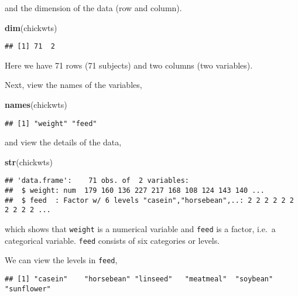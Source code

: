 \documentclass[]{book}
\newenvironment{Shaded}{\begin{snugshade}}{\end{snugshade}}
\newcommand{\KeywordTok}[1]{\textcolor[rgb]{0.13,0.29,0.53}{\textbf{{#1}}}}
\newcommand{\NormalTok}[1]{{#1}}
\theoremstyle{definition}
\theoremstyle{definition}
\theoremstyle{remark}
\begin{document}
and the dimension of the data (row and column).

\begin{Shaded}
\begin{Highlighting}[]
\KeywordTok{dim}\NormalTok{(chickwts)}
\end{Highlighting}
\end{Shaded}

\begin{verbatim}
## [1] 71  2
\end{verbatim}

Here we have 71 rows (71 subjects) and two columns (two variables).

Next, view the names of the variables,

\begin{Shaded}
\begin{Highlighting}[]
\KeywordTok{names}\NormalTok{(chickwts)}
\end{Highlighting}
\end{Shaded}

\begin{verbatim}
## [1] "weight" "feed"
\end{verbatim}

and view the details of the data,

\begin{Shaded}
\begin{Highlighting}[]
\KeywordTok{str}\NormalTok{(chickwts)}
\end{Highlighting}
\end{Shaded}

\begin{verbatim}
## 'data.frame':    71 obs. of  2 variables:
##  $ weight: num  179 160 136 227 217 168 108 124 143 140 ...
##  $ feed  : Factor w/ 6 levels "casein","horsebean",..: 2 2 2 2 2 2 2 2 2 2 ...
\end{verbatim}

which shows that \texttt{weight} is a numerical variable and
\texttt{feed} is a factor, i.e.~a categorical variable. \texttt{feed}
consists of six categories or levels.

We can view the levels in \texttt{feed},

\begin{Shaded}
\end{Shaded}

\begin{verbatim}
## [1] "casein"    "horsebean" "linseed"   "meatmeal"  "soybean"   "sunflower"
\end{verbatim}
\end{document}
